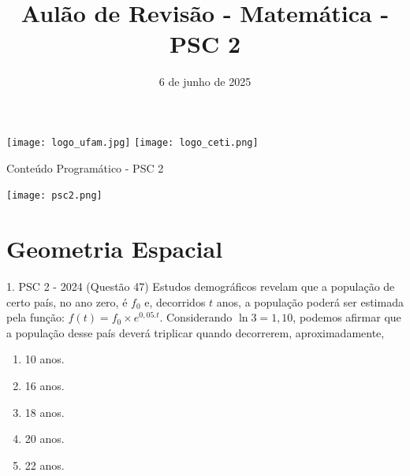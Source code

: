 \documentclass[aspectratio=169]{beamer}
\title[CETi Gilberto Mestrinho]{Aulão de Revisão - Matemática - PSC 2}
\date{6 de junho de 2025}
\newif\ifusarcorvermelha
\newcommand{\vermelho}[1]{%
    \ifusarcorvermelha
        {\color{red}#1}%
    \else
        #1%
    \fi
}
\begin{document}
\justifying
\onehalfspacing

\begin{frame}
    \begin{titlepage}
    \centering
    \vspace*{1cm} %
    
    \noindent%
    \hspace*{0.3\paperwidth}%
    \texttt{[image: logo\_ufam.jpg]}%
    \hfill%
    \texttt{[image: logo\_ceti.png]}%
    \hspace*{0.3\paperwidth}%
    
    \vspace{0.1cm} %

    \vspace{1cm}
    
    \vfill %
    \end{titlepage}
\end{frame}

\begin{frame}{Conteúdo Programático - PSC 2}

    \begin{center}
        \texttt{[image: psc2.png]}
    \end{center}
    
\end{frame}

\section{Geometria Espacial}

    \begin{frame}{1. PSC 2 - 2024 (Questão 47)}
        Estudos demográficos revelam que a população de certo país, no ano zero, é $f_{0}$ e, decorridos $t$ anos, a população poderá ser estimada pela função: $f(t)=f_{0} \times  e^{0,05 . t}$. Considerando $\ln{3}=1,10$, podemos afirmar que a população desse país deverá triplicar quando decorrerem, aproximadamente,

            \begin{enumerate}[a]
                \item 10 anos.
                \item 16 anos.
                \item 18 anos.
                \item 20 anos.
                \item \vermelho{22 anos.} %
            \end{enumerate}
            
    \end{frame}
\end{document}
